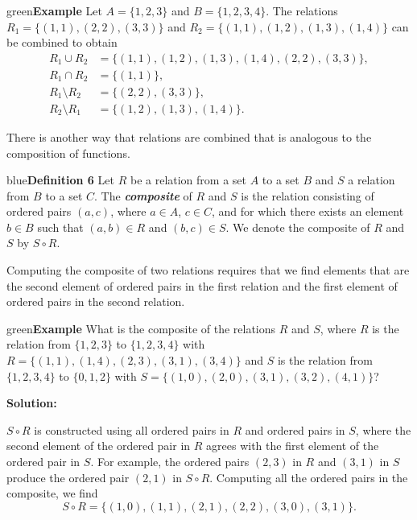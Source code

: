 \documentclass[11pt]{article}
\newenvironment{example}[1][\unskip]{\begin{mybox}{green}{\textbf{Example} {#1}}}{\end{mybox}}
\newenvironment{definition}[1]{\begin{mybox}{blue}{\textbf{Definition #1}}}{\end{mybox}}
\begin{document}
\begin{example}
Let $A = \{1, 2, 3\}$ and $B = \{1, 2, 3, 4\}$. The relations $R_1 = \{(1, 1), (2, 2), (3, 3)\}$ and $R_2 = \{(1, 1), (1, 2), (1, 3), (1, 4)\}$ can be combined to obtain
\begin{align*}
    R_1 \cup R_2 &= \{(1, 1), (1, 2), (1, 3), (1, 4), (2, 2), (3, 3)\},\\
    R_1 \cap R_2 &= \{(1, 1)\},\\
    R_1 \setminus R_2 &= \{(2, 2), (3, 3)\},\\
    R_2 \setminus R_1 &= \{(1, 2), (1, 3), (1, 4)\}.
\end{align*}
\end{example}


There is another way that relations are combined that is analogous to the composition of functions.

\begin{definition}{6}
Let $R$ be a relation from a set $A$ to a set $B$ and $S$ a relation from $B$ to a set $C$. The \textbf{\textit{composite}} of $R$ and $S$ is the relation consisting of ordered pairs $(a, c)$, where $a \in A$, $c \in C$, and for which there exists an element $b \in B$ such that $(a, b) \in R$ and $(b, c) \in S$. We denote the composite of $R$ and $S$ by $S \circ R$.
\end{definition}

Computing the composite of two relations requires that we find elements that are the second element of ordered pairs in the first relation and the first element of ordered pairs in the second relation.

\begin{example}
What is the composite of the relations $R$ and $S$, where $R$ is the relation from $\{1, 2, 3\}$ to $\{1, 2, 3, 4\}$ with $R = \{(1, 1), (1, 4), (2, 3), (3, 1), (3, 4)\}$ and $S$ is the relation from $\{1, 2, 3, 4\}$ to $\{0, 1, 2\}$ with $S = \{(1, 0), (2, 0), (3, 1), (3, 2), (4, 1)\}$?

\textbf{Solution:}

$S \circ R$ is constructed using all ordered pairs in $R$ and ordered pairs in $S$, where the second element of the ordered pair in $R$ agrees with the first element of the ordered pair in $S$. For example, the ordered pairs $(2, 3)$ in $R$ and $(3, 1)$ in $S$ produce the ordered pair $(2, 1)$ in $S \circ R$. Computing all the ordered pairs in the composite, we find
\begin{equation*}
    S \circ R = \{(1, 0), (1, 1), (2, 1), (2, 2), (3, 0), (3, 1)\}.
\end{equation*}
\end{example}
\end{document}
